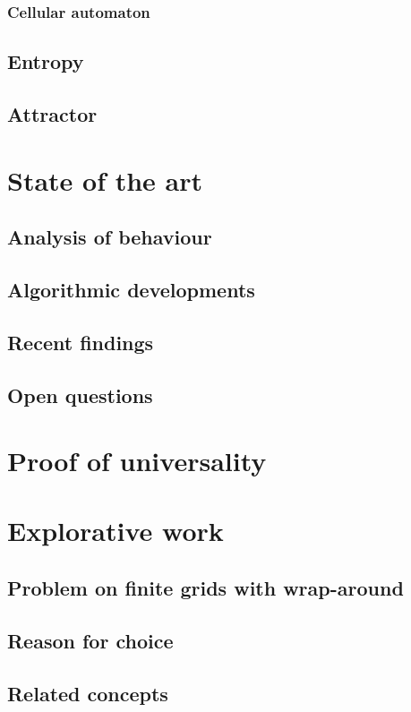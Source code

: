 \documentclass{article}
\begin{document}
\subsubsection{Cellular automaton}
\subsection{Entropy}
\subsection{Attractor}

\section{State of the art}
\subsection{Analysis of behaviour}
\subsection{Algorithmic developments}
\subsection{Recent findings}
\subsection{Open questions}

\section{Proof of universality}

\section{Explorative work}
\subsection{Problem on finite grids with wrap-around}
\subsection{Reason for choice}
\subsection{Related concepts}
\end{document}

